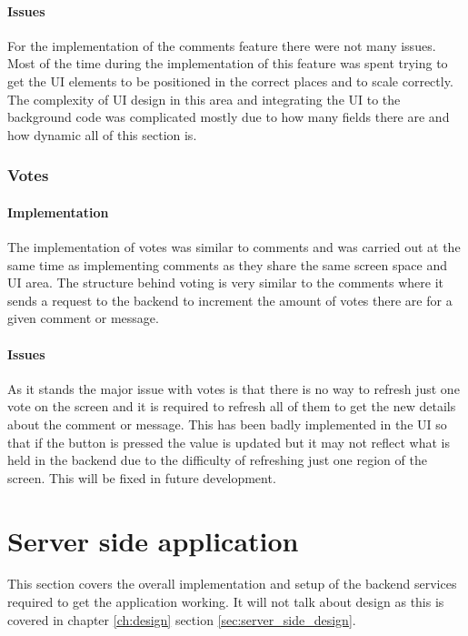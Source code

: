 \paragraph*{Issues}

For the implementation of the comments feature there were not many issues. Most of the time during the implementation of this feature was spent trying to get the UI elements to be positioned in the correct places and to scale correctly. The complexity of UI design in this area and integrating the UI to the background code was complicated mostly due to how many fields there are and how dynamic all of this section is.

\subsubsection{Votes}

\paragraph*{Implementation}

The implementation of votes was similar to comments and was carried out at the same time as implementing comments as they share the same screen space and UI area. The structure behind voting is very similar to the comments where it sends a request to the backend to increment the amount of votes there are for a given comment or message.

\paragraph*{Issues}

As it stands the major issue with votes is that there is no way to refresh just one vote on the screen and it is required to refresh all of them to get the new details about the comment or message. This has been badly implemented in the UI so that if the button is pressed the value is updated but it may not reflect what is held in the backend due to the difficulty of refreshing just one region of the screen. This will be fixed in future development.

\section{Server side application}

This section covers the overall implementation and setup of the backend services required to get the application working. It will not talk about design as this is covered in chapter \ref{ch:design} section \ref{sec:server_side_design}.

